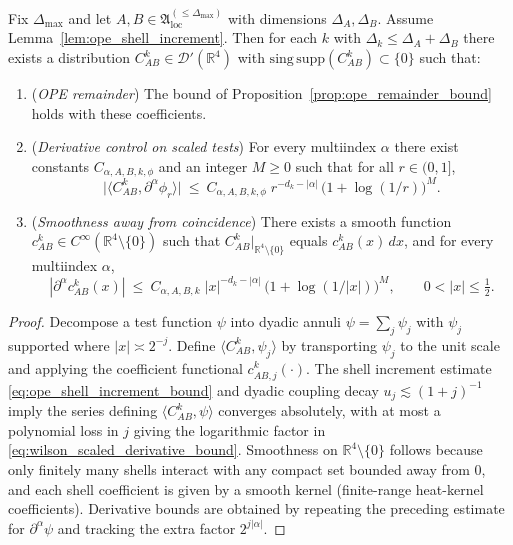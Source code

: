 \begin{theorem}\label{thm:wilson_coeff_limits}
Fix $\Delta_{\max}$ and let $A,B\in\mathfrak A_{\mathrm{loc}}^{(\le\Delta_{\max})}$ with dimensions $\Delta_A,\Delta_B$.
Assume Lemma~\ref{lem:ope_shell_increment}.
Then for each $k$ with $\Delta_k\le \Delta_A+\Delta_B$ there exists a distribution
$C_{AB}^k\in\mathcal D'(\mathbb R^4)$ with $\mathrm{sing\,supp}(C_{AB}^k)\subset\{0\}$ such that:

\begin{enumerate}[leftmargin=*]
\item (\emph{OPE remainder}) The bound of Proposition~\ref{prop:ope_remainder_bound} holds with these coefficients.
\item (\emph{Derivative control on scaled tests})
For every multiindex $\alpha$ there exist constants $C_{\alpha,A,B,k,\phi}$ and an integer $M\ge 0$ such that for all $r\in(0,1]$,
\begin{equation}\label{eq:wilson_scaled_derivative_bound}
\bigl|\langle C_{AB}^k,\partial^\alpha\phi_r\rangle\bigr|
\ \le\ C_{\alpha,A,B,k,\phi}\;
r^{-d_k-|\alpha|}\,\bigl(1+\log(1/r)\bigr)^{M}.
\end{equation}
\item (\emph{Smoothness away from coincidence})
There exists a smooth function $c_{AB}^k\in C^\infty(\mathbb R^4\setminus\{0\})$ such that
$C_{AB}^k|_{\mathbb R^4\setminus\{0\}}$ equals $c_{AB}^k(x)\,dx$, and for every multiindex $\alpha$,
\begin{equation}\label{eq:wilson_pointwise_derivative_bound}
|\partial^\alpha c_{AB}^k(x)|
\ \le\ C_{\alpha,A,B,k}\;
|x|^{-d_k-|\alpha|}\,\bigl(1+\log(1/|x|)\bigr)^{M},
\qquad 0<|x|\le \tfrac12.
\end{equation}
\end{enumerate}
\end{theorem}

\begin{proof}

Decompose a test function $\psi$ into dyadic annuli $\psi=\sum_j \psi_j$ with $\psi_j$ supported where $|x|\asymp 2^{-j}$.
Define $\langle C_{AB}^k,\psi_j\rangle$ by transporting $\psi_j$ to the unit scale and applying the coefficient functional
$c_{AB,j}^k(\cdot)$.
The shell increment estimate \eqref{eq:ope_shell_increment_bound} and dyadic coupling decay $u_j\lesssim (1+j)^{-1}$
imply the series defining $\langle C_{AB}^k,\psi\rangle$ converges absolutely, with at most a polynomial loss in $j$
giving the logarithmic factor in \eqref{eq:wilson_scaled_derivative_bound}.
Smoothness on $\mathbb R^4\setminus\{0\}$ follows because only finitely many shells interact with any compact set bounded away from $0$,
and each shell coefficient is given by a smooth kernel (finite-range heat-kernel coefficients).
Derivative bounds are obtained by repeating the preceding estimate for $\partial^\alpha\psi$ and tracking the extra factor $2^{j|\alpha|}$.
\end{proof}

